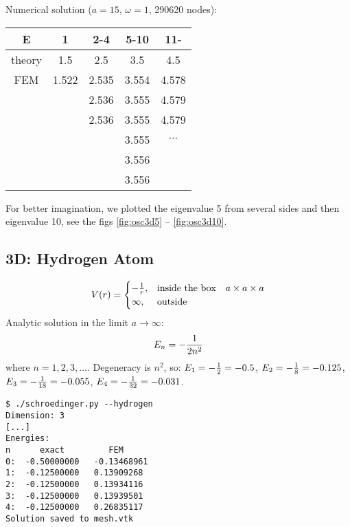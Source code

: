 Numerical solution ($a=15$, $\omega=1$, 290620 nodes):

\begin{tabular}{ c | c c c c }
E      & 1 & 2-4 & 5-10 & 11- \\
\hline
theory & 1.5 & 2.5 & 3.5 & 4.5 \\
FEM    & 1.522 & 2.535 & 3.554 & 4.578 \\
       &        & 2.536 & 3.555 & 4.579 \\
       &        & 2.536 & 3.555 & 4.579 \\
       &        &       & 3.555 &  $\cdots$ \\
       &        &       & 3.556 &   \\
       &        &       & 3.556 &   \\
\end{tabular}

For better imagination, we plotted the eigenvalue 5 from several sides and then
eigenvalue 10, see the figs \ref{fig:osc3d5} -- \ref{fig:osc3d10}.





\subsection{3D: Hydrogen Atom}

$$V(r)=\begin{cases}-{1\over r},&\text{inside the box}\quad a\times a\times a \\
\infty, & \text{outside}\end{cases}$$
Analytic solution in the limit $a\to\infty$:
$$E_n=-{1\over2n^2}$$
where $n=1, 2, 3, \dots$.
Degeneracy is $n^2$, so:
$E_1 = -{1\over2}=-0.5$,
$E_2 = -{1\over8}=-0.125$,
$E_3 = -{1\over18}=-0.055$,
$E_4 = -{1\over32}=-0.031$.

\begin{lstlisting}
$ ./schroedinger.py --hydrogen
Dimension: 3
[...]
Energies:
n      exact         FEM
0:  -0.50000000   -0.13468961
1:  -0.12500000   0.13909268
2:  -0.12500000   0.13934116
3:  -0.12500000   0.13939501
4:  -0.12500000   0.26835117
Solution saved to mesh.vtk
\end{lstlisting}

